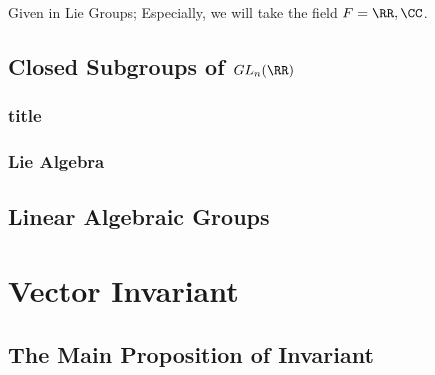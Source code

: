 \documentclass[Total.tex]{subfiles}
\begin{document}
			Given in Lie Groups; Especially, we will take the field $F=\RR,\CC$.
			
		\section{Closed Subgroups of $GL_n(\RR)$}
			\subsection{title}
			\subsection{Lie Algebra }
		\section{Linear Algebraic Groups}
	\chapter{Vector Invariant}
		\section{The Main Proposition of Invariant}
\end{document}
